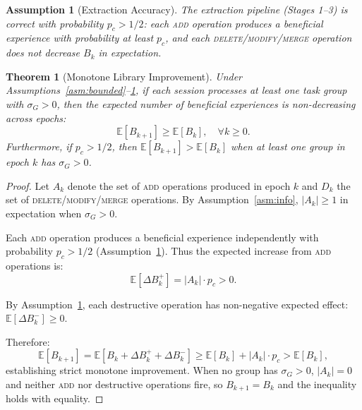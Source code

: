 \documentclass[11pt]{article}
\newtheorem{theorem}{Theorem}
\newtheorem{assumption}{Assumption}
\begin{document}
\begin{assumption}[Extraction Accuracy]
\label{asm:accuracy}
The extraction pipeline (Stages 1--3) is correct with probability $p_c > 1/2$:
each \textsc{add} operation produces a beneficial experience with probability
at least $p_c$, and each \textsc{delete}/\textsc{modify}/\textsc{merge} operation
does not decrease $B_k$ in expectation.
\end{assumption}

\begin{theorem}[Monotone Library Improvement]
\label{thm:monotone}
Under Assumptions~\ref{asm:bounded}--\ref{asm:accuracy}, if each session
processes at least one task group with $\sigma_G > 0$, then the expected number
of beneficial experiences is non-decreasing across epochs:
\begin{equation}
    \mathbb{E}[B_{k+1}] \geq \mathbb{E}[B_k], \quad \forall k \geq 0.
    \label{eq:monotone}
\end{equation}
Furthermore, if $p_c > 1/2$, then $\mathbb{E}[B_{k+1}] > \mathbb{E}[B_k]$
when at least one group in epoch $k$ has $\sigma_G > 0$.
\end{theorem}

\begin{proof}
Let $A_k$ denote the set of \textsc{add} operations produced in epoch $k$
and $D_k$ the set of \textsc{delete}/\textsc{modify}/\textsc{merge} operations.
By Assumption~\ref{asm:info}, $|A_k| \geq 1$ in expectation when $\sigma_G > 0$.

Each \textsc{add} operation produces a beneficial experience independently with
probability $p_c > 1/2$ (Assumption~\ref{asm:accuracy}). Thus the expected
increase from \textsc{add} operations is:
\begin{equation}
    \mathbb{E}[\Delta B_k^+] = |A_k| \cdot p_c > 0.
\end{equation}

By Assumption~\ref{asm:accuracy}, each destructive operation has non-negative
expected effect: $\mathbb{E}[\Delta B_k^-] \geq 0$.

Therefore:
\begin{equation}
    \mathbb{E}[B_{k+1}] = \mathbb{E}[B_k + \Delta B_k^+ + \Delta B_k^-]
    \geq \mathbb{E}[B_k] + |A_k| \cdot p_c > \mathbb{E}[B_k],
\end{equation}
establishing strict monotone improvement. When no group has $\sigma_G > 0$,
$|A_k| = 0$ and neither \textsc{add} nor destructive operations fire, so
$B_{k+1} = B_k$ and the inequality holds with equality.
\end{proof}
\end{document}
